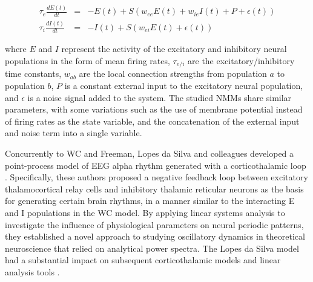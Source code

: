 \documentclass[12pt,twoside]{article}
\begin{document}
\begin{eqnarray}
    \tau_{e}\frac{dE(t)}{dt} &=& -E(t) + S(w_{ee}E(t) + w_{ie}I(t) + P + \epsilon(t)) \\
    \tau_{i}\frac{dI(t)}{dt} &=& -I(t) + S(w_{ei}E(t) + \epsilon(t))
\end{eqnarray}

where $E$ and $I$ represent the activity of the excitatory and inhibitory neural populations in the form of mean firing rates, $\tau_{e/i}$ are the excitatory/inhibitory time constants, $w_{ab}$ are the local connection strengths from population $a$ to population $b$, $P$ is a constant external input to the excitatory neural population, and $\epsilon$ is a noise signal added to the system. The studied NMMs share similar parameters, with some variations such as the use of membrane potential instead of firing rates as the state variable, and the concatenation of the external input and noise term into a single variable.

Concurrently to WC and Freeman, Lopes da Silva and colleagues developed a point-process model of EEG alpha rhythm generated with a corticothalamic loop \citep{lopes1974model}. Specifically, these authors proposed a negative feedback loop between excitatory thalamocortical relay cells and inhibitory thalamic reticular neurons as the basis for generating certain brain rhythms, in a manner similar to the interacting E and I populations in the WC model. By applying linear systems analysis to investigate the influence of physiological parameters on neural periodic patterns, they established a novel approach to studying oscillatory dynamics in theoretical neuroscience that relied on analytical power spectra.
The Lopes da Silva model had a substantial impact on subsequent corticothalamic models and linear analysis tools \citep{cona2014thalamo,bhattacharya2011thalamo}.
\end{document}
